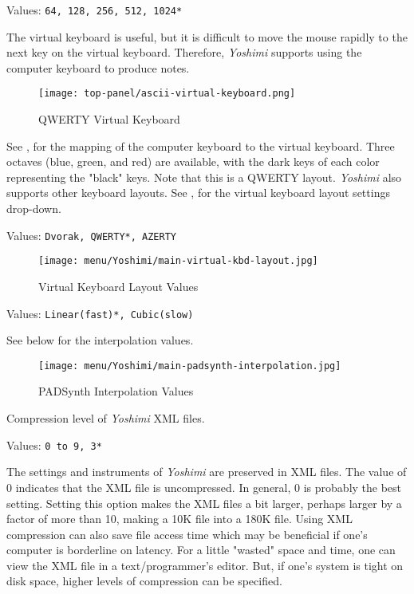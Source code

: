    Values: \texttt{64, 128, 256, 512, 1024*}

   The virtual keyboard is useful, but it is difficult to move the mouse
   rapidly to the next key on the virtual keyboard.
   Therefore, \textsl{Yoshimi} supports using the computer keyboard
   to produce notes.

\begin{figure}[H]
   \centering 
   \texttt{[image: top-panel/ascii-virtual-keyboard.png]}
   \caption{QWERTY Virtual Keyboard}
   \label{fig:qwerty_virtual_keyboard}
\end{figure}

   See ,
   for the mapping of the computer keyboard to the
   virtual keyboard.
   Three octaves (blue, green, and red) are available, with the dark keys of
   each color representing the "black" keys.
   Note that this is a QWERTY layout.  
   \textsl{Yoshimi} also supports other keyboard layouts.
   See ,
   for the virtual keyboard
   layout settings drop-down.

   Values: \texttt{Dvorak, QWERTY*, AZERTY}

\begin{figure}[H]
   \centering 
   \texttt{[image: menu/Yoshimi/main-virtual-kbd-layout.jpg]}
   \caption[Virtual Keyboard Layout]{Virtual Keyboard Layout Values}
   \label{fig:virtual_kbd_layout} 
\end{figure}


   Values: \texttt{Linear(fast)*, Cubic(slow)}

   See  below
   for the interpolation values.

\begin{figure}[H]
   \centering 
   \texttt{[image: menu/Yoshimi/main-padsynth-interpolation.jpg]}
   \caption[PADSynth Interpolation]{PADSynth Interpolation Values}
   \label{fig:padsynth_interpolation}
\end{figure}

   Compression level of \textsl{Yoshimi} XML files.

   Values: \texttt{0 to 9, 3*}

   The settings and instruments of
   \textsl{Yoshimi}
   are preserved in XML files.
   The value of 0 indicates that the XML file is uncompressed.
   In general, 0 is probably the best setting.
   Setting this option makes the XML files a bit larger, perhaps larger by a 
   factor of more than 10, making a 10K file into a 180K file.
   Using XML compression can also save file access time which may be
   beneficial if one's computer is borderline on latency.
   For a little "wasted"
   space and time, one can view the XML file in a text/programmer's editor.
   But, if one's system is tight on disk space, higher levels of compression
   can be specified.

